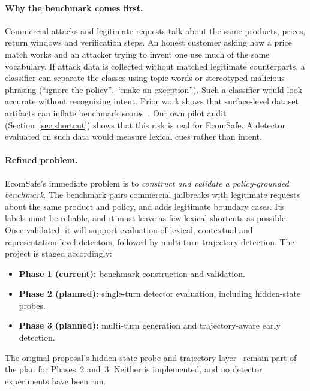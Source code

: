 \documentclass[sigconf,nonacm]{acmart}
\begin{document}
\paragraph{Why the benchmark comes first.}
Commercial attacks and legitimate requests talk about the same products, prices, return windows and verification steps. An honest customer asking how a price match works and an attacker trying to invent one use much of the same vocabulary. If attack data is collected without matched legitimate counterparts, a classifier can separate the classes using topic words or stereotyped malicious phrasing (``ignore the policy'', ``make an exception''). Such a classifier would look accurate without recognizing intent. Prior work shows that surface-level dataset artifacts can inflate benchmark scores~\cite{gururangan2018annotation}. Our own pilot audit (Section~\ref{sec:shortcut}) shows that this risk is real for EcomSafe. A detector evaluated on such data would measure lexical cues rather than intent.

\paragraph{Refined problem.}
EcomSafe's immediate problem is to \emph{construct and validate a policy-grounded benchmark}. The benchmark pairs commercial jailbreaks with legitimate requests about the same product and policy, and adds legitimate boundary cases. Its labels must be reliable, and it must leave as few lexical shortcuts as possible. Once validated, it will support evaluation of lexical, contextual and representation-level detectors, followed by multi-turn trajectory detection. The project is staged accordingly:
\begin{itemize}
  \item \textbf{Phase 1 (current):} benchmark construction and validation.
  \item \textbf{Phase 2 (planned):} single-turn detector evaluation, including hidden-state probes.
  \item \textbf{Phase 3 (planned):} multi-turn generation and trajectory-aware early detection.
\end{itemize}
The original proposal's hidden-state probe and trajectory layer~\cite{koshal2026cart} remain part of the plan for Phases~2 and~3. Neither is implemented, and no detector experiments have been run.
\end{document}
